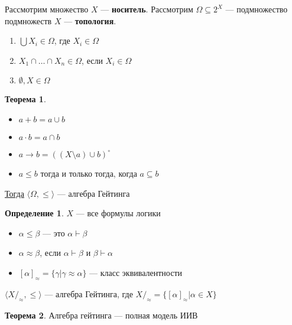 \documentclass[english]{article}
\newcounter{propertycnt}
\newcommand{\beginproperty}{\setcounter{propertycnt}{1}}
\theoremstyle{plain}
\newenvironment{property}{
  \renewcommand\thepropertyinner{\arabic{propertycnt}}
  \propertyinner
}{\endpropertyinner\stepcounter{propertycnt}}
\theoremstyle{remark}
\theoremstyle{definition}
\newtheorem{theorem}{Теорема}[section]
\newtheorem*{definition}{Определение}
\begin{document}
\begin{defintion}
Рассмотрим множество \(X\) --- \textbf{носитель}. Рассмотрим \(\Omega \subseteq 2^X\) --- подмножество подмножеств \(X\) --- \textbf{топология}.
\begin{enumerate}
\item \(\bigcup X_i \in \Omega\), где \(X_i \in \Omega\)
\item \(X_1 \cap \dots \cap X_n \in \Omega\), если \(X_i \in \Omega\)
\item \(\emptyset, X \in \Omega\)
\end{enumerate}
\end{defintion}
\begin{theorem}
\-
\begin{itemize}
\item \(a + b = a \cup b\)
\item \(a \cdot b = a \cap b\)
\item \(a \to b = \left((X \setminus a) \cup b\right)^\circ\)
\item \(a \le b\) тогда и только тогда, когда \(a \subseteq b\)
\end{itemize}
\uline{Тогда} \(\langle \Omega, \le \rangle\) --- алгебра Гейтинга
\end{theorem}
\begin{definition}
\(X\) --- все формулы логики
\begin{itemize}
\item \(\alpha \le \beta\) --- это \(\alpha \vdash \beta\)
\item \(\alpha \approx \beta\), если \(\alpha \vdash \beta\) и \(\beta \vdash \alpha\)
\item \([\alpha]_\approx = \{\gamma \big| \gamma \approx \alpha\}\) --- класс эквивалентности
\end{itemize}
\end{definition}
\beginproperty
\begin{property}
\(\langle X/_\approx, \le \rangle\) --- алгебра Гейтинга, где \(X/_\approx = \{[\alpha]_\approx \big| \alpha \in X\}\)
\end{property}
\begin{theorem}
Алгебра гейтинга --- полная модель ИИВ
\end{theorem}
\end{document}
